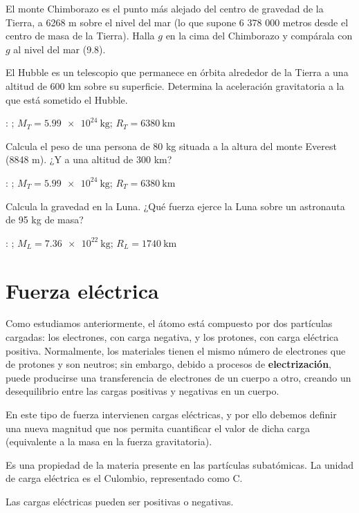 \begin{exercise}
    El monte Chimborazo es el punto más alejado del centro de gravedad de la Tierra, a 6268 m sobre el nivel del mar (lo que supone 6 378 000 metros desde el centro de masa de la Tierra).
    Halla \( g \) en la cima del Chimborazo y compárala con \( g \) al nivel del mar (\qty{9.8}{\mpss}).
\end{exercise}

\begin{exercise}
    El Hubble es un telescopio que permanece en órbita alrededor de la Tierra a una altitud de 600 km sobre su superficie.
    Determina la aceleración gravitatoria a la que está sometido el Hubble.

    \datos{}: \Ggravitacion; \( M_T = \qty{5.99e24}{\kilo\g} \); \( R_T = \qty{6380}{\kilo\metre} \)
\end{exercise}


\begin{exercise}
    Calcula el peso de una persona de 80 kg situada a la altura del monte Everest (8848 m).
    ¿Y a una altitud de 300 km?

    \datos{}: \Ggravitacion; \( M_T = \qty{5.99e24}{\kilo\g} \); \( R_T = \qty{6380}{\kilo\metre} \)
\end{exercise}


\begin{exercise}
    Calcula la gravedad en la Luna. ¿Qué fuerza ejerce la Luna sobre un astronauta de 95 kg de masa?

    \datos{}: \Ggravitacion; \( M_L = \qty{7.36e22}{\kilo\g} \); \( R_L = \qty{1740}{\kilo\metre} \)
\end{exercise}


\section{Fuerza eléctrica}

Como estudiamos anteriormente, el átomo está compuesto por dos partículas cargadas: los electrones, con carga negativa, y los protones, con carga eléctrica positiva.
Normalmente, los materiales tienen el mismo número de electrones que de protones y son neutros; sin embargo, debido a procesos de \textbf{electrización}, puede producirse una transferencia de electrones de un cuerpo a otro, creando un desequilibrio entre las cargas positivas y negativas en un cuerpo.

En este tipo de fuerza intervienen cargas eléctricas, y por ello debemos definir una nueva magnitud que nos permita cuantificar el valor de dicha carga (equivalente a la masa en la fuerza gravitatoria).
\begin{definition}
    Es una propiedad de la materia presente en las partículas subatómicas.
    La unidad de carga eléctrica es el Culombio, representado como \( \unit{\coulomb} \).

    Las cargas eléctricas pueden ser positivas o negativas.
\end{definition}

